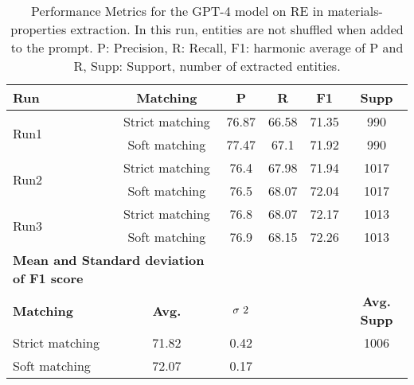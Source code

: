 \begin{table}[htbp]
    \small
    \centering
    \caption{Performance Metrics for the GPT-4 model on RE in materials-properties extraction. In this run, entities are not shuffled when added to the prompt. P: Precision, R: Recall, F1: harmonic average of P and R, Supp: Support, number of extracted entities.}
    \begin{tabular}{lccccc}
        \toprule
        \textbf{Run} & \textbf{Matching} & \textbf{P} & \textbf{R} & \textbf{F1} & \textbf{Supp} \\
        \midrule
        \multirow{2}{*}{Run1} & Strict matching & 76.87 & 66.58 & 71.35 & 990 \\
        & Soft matching & 77.47 & 67.1 & 71.92 & 990 \\
        \midrule
        \multirow{2}{*}{Run2} & Strict matching & 76.4 & 67.98 & 71.94 & 1017 \\
        & Soft matching & 76.5 & 68.07 & 72.04 & 1017 \\
        \midrule
        \multirow{2}{*}{Run3} & Strict matching & 76.8 & 68.07 & 72.17 & 1013 \\
        & Soft matching & 76.9 & 68.15 & 72.26 & 1013 \\
        \midrule
        \multicolumn{2}{l}{\textbf{Mean and Standard deviation of F1 score}} & & & & \\
        \midrule
        \textbf{Matching} & \textbf{Avg.} & $\sigma\textsuperscript{2}$ & & & \textbf{Avg. Supp}\\
        Strict matching & 71.82 & 0.42 & & & 1006 \\
        Soft matching   & 72.07 & 0.17 & & \\
        \bottomrule
    \end{tabular}
\end{table}


